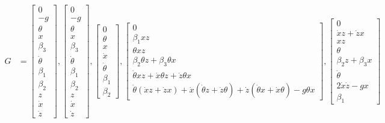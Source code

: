 \documentclass[12pt]{article}
\begin{document}
\begin{align*}
    G &= \left[\begin{matrix}0\\- g\\\theta\\x\\\beta_{3}\\\dot{\theta}\\\beta_{1}\\\beta_{2}\\z\\\dot{x}\\\dot{z}\end{matrix}\right], 
    \left[\begin{matrix}0\\- g\\\theta\\x\\\beta_{3}\\\dot{\theta}\\\beta_{1}\\\beta_{2}\\z\\\dot{x}\\\dot{z}\end{matrix}\right], 
    \left[\begin{matrix}0\\\theta\\x\\\dot{x}\\\dot{\theta}\\\beta_{1}\\\beta_{2}\end{matrix}\right], 
    \left[\begin{matrix}0\\\beta_{1} x z\\\theta x z\\\beta_{2} \theta z + \beta_{3} \theta x\\\dot{\theta} x z + \dot{x} \theta z + \dot{z} \theta x\\\dot{\theta} \left(\dot{x} z + \dot{z} x\right) + \dot{x} \left(\dot{\theta} z + \dot{z} \theta\right) + \dot{z} \left(\dot{\theta} x + \dot{x} \theta\right) - g \theta x\end{matrix}\right],
    \left[\begin{matrix}0\\\dot{x} z + \dot{z} x\\x z\\\theta\\\beta_{2} z + \beta_{3} x\\\dot{\theta}\\2 \dot{x} \dot{z} - g x\\\beta_{1}\end{matrix}\right] \\

\end{align*}
\end{document}
